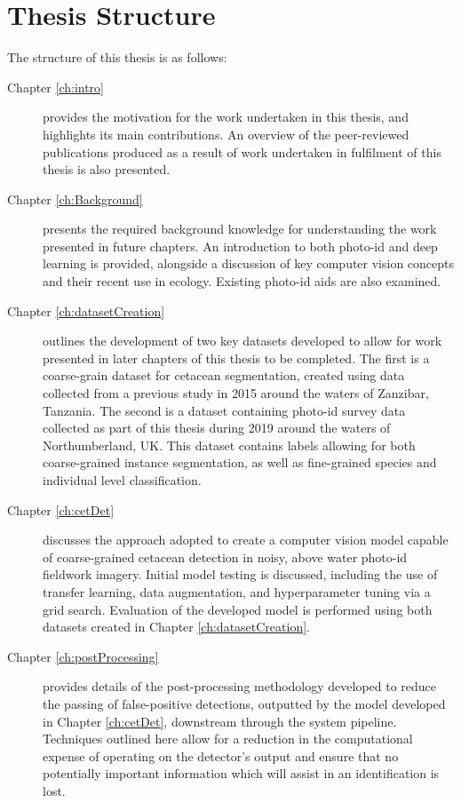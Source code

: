 \section{Thesis Structure}\label{ch:intro,sec:Structure}

The structure of this thesis is as follows:

\begin{description}
	\item[Chapter \ref{ch:intro}] provides the motivation for the work undertaken in this thesis, and highlights its main contributions. An overview of the peer-reviewed publications produced as a result of work undertaken in fulfilment of this thesis is also presented.
	
	\item[Chapter \ref{ch:Background}] presents the required background knowledge for understanding the work presented in future chapters. An introduction to both photo-id and deep learning is provided, alongside a discussion of key computer vision concepts and their recent use in ecology. Existing photo-id aids are also examined.
	
	\item[Chapter \ref{ch:datasetCreation}] outlines the development of two key datasets developed to allow for work presented in later chapters of this thesis to be completed. The first is a coarse-grain dataset for cetacean segmentation, created using data collected from a previous study in 2015 around the waters of Zanzibar, Tanzania. The second is a dataset containing photo-id survey data collected as part of this thesis during 2019 around the waters of Northumberland, UK. This dataset contains labels allowing for both coarse-grained instance segmentation, as well as fine-grained species and individual level classification.
	
	\item[Chapter \ref{ch:cetDet}] discusses the approach adopted to create a computer vision model capable of coarse-grained cetacean detection in noisy, above water photo-id fieldwork imagery. Initial model testing is discussed, including the use of transfer learning, data augmentation, and hyperparameter tuning via a grid search. Evaluation of the developed model is performed using both datasets created in Chapter \ref{ch:datasetCreation}.
	
	\item[Chapter \ref{ch:postProcessing}] provides details of the post-processing methodology developed to reduce the passing of false-positive detections, outputted by the model developed in Chapter \ref{ch:cetDet}, downstream through the system pipeline. Techniques outlined here allow for a reduction in the computational expense of operating on the detector's output and ensure that no potentially important information which will assist in an identification is lost.


\end{description}
